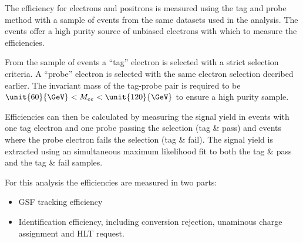 The efficiency for electrons and positrons is measured using the tag and probe
method 
with a sample of \Zee events from the same datasets used in the analysis. 
The \Zee events offer a high purity source of unbiased electrons with which to
measure the efficiencies.

From the sample of \Zee events a ``tag'' electron is selected with a strict
selection criteria. 
A ``probe'' electron is selected with the same electron selection decribed
earlier.
The invariant mass of the tag-probe pair is required to be
$\unit{60}{\GeV} < M_{ee} < \unit{120}{\GeV}$ to ensure a high purity sample.

Efficiencies can then be calculated by measuring the signal yield in events
with one tag electron and one probe passing the selection (tag \& pass) and
events where the probe electron fails the selection (tag \& fail).
The signal yield is extracted using an simultaneous maximum likelihood fit to
both the tag \& pass and the tag \& fail samples.

For this analysis the efficiencies are measured in two parts:

\begin{itemize}
    \item GSF tracking efficiency
    \item Identification efficiency, including conversion rejection, unaminous
charge assignment and HLT request.
\end{itemize}

